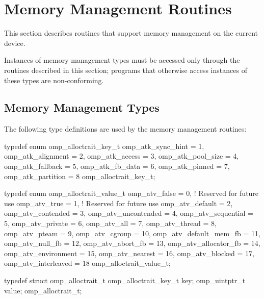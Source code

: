 
\section{Memory Management Routines}
\label{sec:Memory Management Routines}
This section describes routines that support memory management on the current device.

Instances of memory management types must be accessed only through 
the routines described in this section; programs that otherwise 
access instances of these types are non-conforming.



\subsection{Memory Management Types}
\label{subsec:Memory Management Types}

The following type definitions are used by the memory management routines:

\begin{ccppspecific}
\begin{ompEnv}
typedef enum omp_alloctrait_key_t {
  omp_atk_sync_hint = 1,
  omp_atk_alignment = 2,
  omp_atk_access = 3,
  omp_atk_pool_size = 4,
  omp_atk_fallback = 5,
  omp_atk_fb_data = 6,
  omp_atk_pinned = 7,
  omp_atk_partition = 8
} omp_alloctrait_key_t;

typedef enum omp_alloctrait_value_t {
  omp_atv_false = 0,  ! Reserved for future use
  omp_atv_true = 1,   ! Reserved for future use
  omp_atv_default = 2,
  omp_atv_contended = 3,
  omp_atv_uncontended = 4,
  omp_atv_sequential = 5,
  omp_atv_private = 6,
  omp_atv_all = 7,
  omp_atv_thread = 8,
  omp_atv_pteam = 9,
  omp_atv_cgroup = 10,
  omp_atv_default_mem_fb = 11,
  omp_atv_null_fb = 12,
  omp_atv_abort_fb = 13,
  omp_atv_allocator_fb = 14,
  omp_atv_environment = 15,
  omp_atv_nearest = 16,
  omp_atv_blocked = 17,
  omp_atv_interleaved = 18
} omp_alloctrait_value_t;

typedef struct omp_alloctrait_t {
  omp_alloctrait_key_t key;
  omp_uintptr_t value;
} omp_alloctrait_t;

\end{ompEnv}
\end{ccppspecific}

